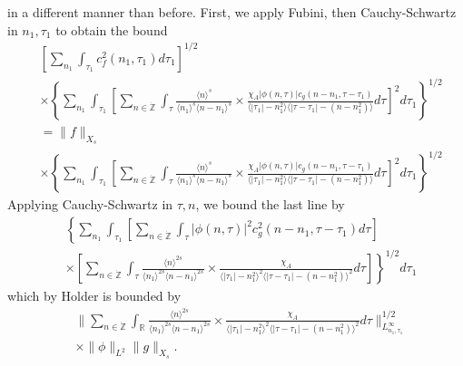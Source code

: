 \documentclass[12pt,reqno]{amsart}
\numberwithin{equation}{section}  %
\newcommand{\rr}{\mathbb{R}}
\newcommand{\zz}{\mathbb{Z}}
\newcommand{\zzdot}{\dot{\zz}}
\begin{document}
in a different manner than before. First, we apply 
Fubini, then Cauchy-Schwartz in $n_{1}, \tau_{1}$ to obtain the bound
%
%
\begin{equation*}
\begin{split}
  & \left[ \sum_{n_{1}} \int_{\tau_{1}} c_{f}^{2}(n_{1}, \tau_{1}) d \tau_{1}
  \right]^{1/2}
  \\
  & \times \left \{\sum_{n_{1}} \int_{\tau_{1}}   
 \left[
 \sum_{n \in \zzdot} \int_{\tau}
   \frac{\langle n \rangle ^{s}}{\langle n_{1} \rangle ^{s} \langle
   n - n_{1}\rangle ^{s}} \times \frac{\chi_{A} |\phi(n, \tau)| c_{g}(n -
   n_{1}, \tau - \tau_{1})
}{\langle | \tau_{1} | - n_{1}^{2} \rangle \langle | \tau -
  \tau_{1} | - (n - n_{1}^{2}) \rangle} d \tau 
  \right]^{2} d \tau_{1} \right \}^{1/2}
  \\
  & = \| f \|_{X_{s}}
  \\
  & \times \left \{\sum_{n_{1}} \int_{\tau_{1}}   
 \left[
 \sum_{n \in \zzdot} \int_{\tau}
   \frac{\langle n \rangle ^{s}}{\langle n_{1} \rangle ^{s} \langle
   n - n_{1}\rangle ^{s}} \times \frac{\chi_{A}|\phi(n, \tau)| c_{g}(n -
   n_{1}, \tau - \tau_{1})
}{\langle | \tau_{1} | - n_{1}^{2} \rangle \langle | \tau -
  \tau_{1} | - (n - n_{1}^{2}) \rangle} d \tau 
  \right]^{2} d \tau_{1}  \right \}^{1/2}
\end{split}
\end{equation*}
%
Applying Cauchy-Schwartz in $\tau, n$, we bound the last line by 
%
%
\begin{equation*}
\begin{split}
  & \left \{\sum_{n_{1}} \int_{\tau_{1}}   
  \left [ \sum_{n \in \zzdot} \int_{\tau}
  | \phi(n, \tau)|^{2} c_{g}^{2}(n - n_{1}, \tau - \tau_{1}) d \tau  
    \right ] \right . 
   \\
   & \left. \times \left [ \sum_{n \in \zzdot} \int_{\tau} \frac{\langle n \rangle
   ^{2s}}{\langle n_{1} \rangle ^{2s} \langle n - n_{1}\rangle ^{2s}}
   \times \frac{\chi_{A}}{\langle | \tau_{1} |
   - n_{1}^{2} \rangle^{2}  \langle | \tau - \tau_{1} | - (n - n_{1}^{2})
   \rangle^{2}} d \tau  \right ] \right \}^{1/2}d \tau_{1} 
\end{split}
\end{equation*}
%
%
which by Holder is bounded by 
%
%
%
\begin{equation}
  \label{integral-bound-2nd-form-per}
\begin{split}
  & \| \sum_{n \in \zzdot} \int_{\rr} \frac{\langle n \rangle ^{2s}}{\langle n_{1} \rangle ^{2s} \langle
  n - n_{1}\rangle ^{2s}}  \times \frac{\chi_{A}}{\langle | \tau_{1} | - n_{1}^{2} \rangle^{2}  \langle | \tau -
  \tau_{1} | - (n - n_{1}^{2}) \rangle^{2}} d \tau 
  \|_{L^{\infty}_{n_{1}, \tau_{1}}}^{1/2}
  \\
  & \times \|\phi\|_{L^{2}} \| g \|_{X_{s}}.
\end{split}
\end{equation}
\end{document}
